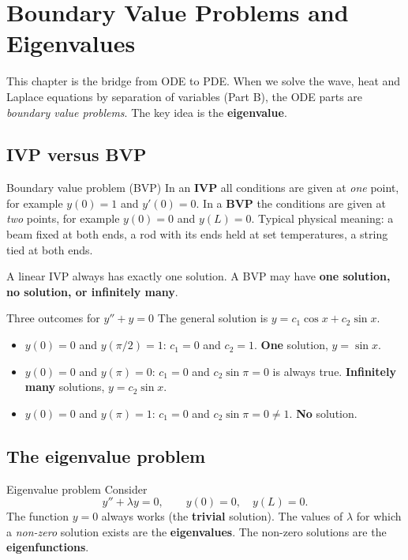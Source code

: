 \chapter{Boundary Value Problems and Eigenvalues}

This chapter is the bridge from ODE to PDE. When we solve the wave, heat and Laplace equations by separation of variables (Part B), the ODE parts are \emph{boundary value problems}. The key idea is the \textbf{eigenvalue}.

\section{IVP versus BVP}

\begin{defbox}{Boundary value problem (BVP)}
In an \textbf{IVP} all conditions are given at \emph{one} point, for example $y(0)=1$ and $y'(0)=0$. In a \textbf{BVP} the conditions are given at \emph{two} points, for example $y(0) = 0$ and $y(L) = 0$. Typical physical meaning: a beam fixed at both ends, a rod with its ends held at set temperatures, a string tied at both ends.
\end{defbox}

\begin{notebox}
A linear IVP always has exactly one solution. A BVP may have \textbf{one solution, no solution, or infinitely many}.
\end{notebox}

\begin{examplebox}{Three outcomes for $y'' + y = 0$}
The general solution is $y = c_1\cos x + c_2\sin x$.
\begin{itemize}
  \item $y(0)=0$ and $y(\pi/2)=1$: $c_1 = 0$ and $c_2 = 1$. \textbf{One} solution, $y = \sin x$.
  \item $y(0)=0$ and $y(\pi)=0$: $c_1 = 0$ and $c_2\sin\pi = 0$ is always true. \textbf{Infinitely many} solutions, $y = c_2\sin x$.
  \item $y(0)=0$ and $y(\pi)=1$: $c_1=0$ and $c_2\sin\pi = 0 \neq 1$. \textbf{No} solution.
\end{itemize}
\end{examplebox}

\section{The eigenvalue problem}

\begin{defbox}{Eigenvalue problem}
Consider
\[ y'' + \lambda y = 0, \qquad y(0) = 0, \quad y(L) = 0 . \]
The function $y=0$ always works (the \textbf{trivial} solution). The values of $\lambda$ for which a \emph{non-zero} solution exists are the \textbf{eigenvalues}. The non-zero solutions are the \textbf{eigenfunctions}.
\end{defbox}

